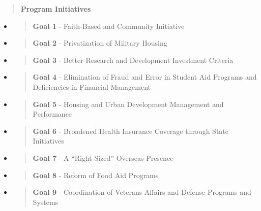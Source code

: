 \documentclass[a4paper, 11pt]{article}
\begin{document}
\begin{itemize}
\begin{quote}
\textbf{Program Initiatives}
\end{quote}

\begin{itemize}
\item
  \begin{quote}
  \textbf{Goal 1} - Faith-Based and Community Initiative
  \end{quote}
\item
  \begin{quote}
  \textbf{Goal 2} - Privatization of Military Housing
  \end{quote}
\item
  \begin{quote}
  \textbf{Goal 3} - Better Research and Development Investment Criteria
  \end{quote}
\item
  \begin{quote}
  \textbf{Goal 4} - Elimination of Fraud and Error in Student Aid
  Programs and Deficiencies in Financial Management
  \end{quote}
\item
  \begin{quote}
  \textbf{Goal 5} - Housing and Urban Development Management and
  Performance
  \end{quote}
\item
  \begin{quote}
  \textbf{Goal 6} - Broadened Health Insurance Coverage through State
  Initiatives
  \end{quote}
\item
  \begin{quote}
  \textbf{Goal 7} - A ``Right-Sized'' Overseas Presence
  \end{quote}
\item
  \begin{quote}
  \textbf{Goal 8} - Reform of Food Aid Programs
  \end{quote}
\item
  \begin{quote}
  \textbf{Goal 9} - Coordination of Veterans Affairs and Defense
  Programs and Systems
  \end{quote}
\end{itemize}
\end{itemize}

\end{document}

